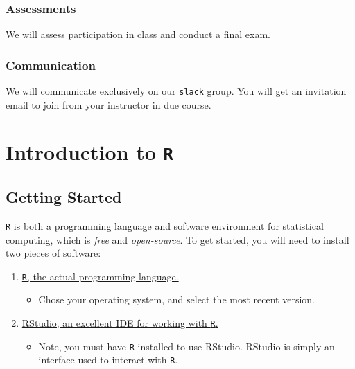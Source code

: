 \documentclass[]{book}
\providecommand{\tightlist}{%
  \setlength{\itemsep}{0pt}\setlength{\parskip}{0pt}}
\begin{document}
\subsection*{Assessments}\label{assessments}

We will assess participation in class and conduct a final exam.

\subsection*{Communication}\label{communication}

We will communicate exclusively on our
\href{https://scpomtrics.slack.com}{\texttt{slack}} group. You will get
an invitation email to join from your instructor in due course.

\chapter{\texorpdfstring{Introduction to
\texttt{R}}{Introduction to R}}\label{R-intro}

\section{Getting Started}\label{getting-started}

\texttt{R} is both a programming language and software environment for
statistical computing, which is \emph{free} and \emph{open-source}. To
get started, you will need to install two pieces of software:

\begin{enumerate}
\def\labelenumi{\arabic{enumi}.}
\tightlist
\item
  \href{https://www.r-project.org}{\texttt{R}, the actual programming
  language.}

  \begin{itemize}
  \tightlist
  \item
    Chose your operating system, and select the most recent version.
  \end{itemize}
\item
  \href{http://www.rstudio.com/}{RStudio, an excellent IDE for working
  with \texttt{R}.}

  \begin{itemize}
  \tightlist
  \item
    Note, you must have \texttt{R} installed to use RStudio. RStudio is
    simply an interface used to interact with \texttt{R}.
  \end{itemize}
\end{enumerate}
\end{document}
